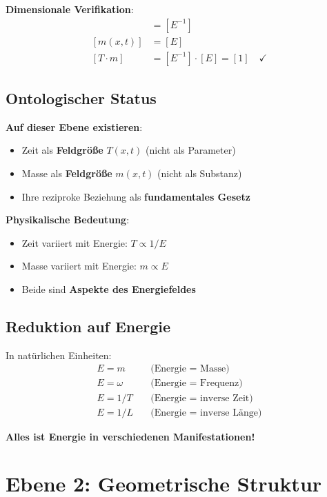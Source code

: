 \textbf{Dimensionale Verifikation}:
\begin{align}
[T(x,t)] &= [E^{-1}] \\
[m(x,t)] &= [E] \\
[T \cdot m] &= [E^{-1}] \cdot [E] = [1] \quad \checkmark
\end{align}

\subsection{Ontologischer Status}

\textbf{Auf dieser Ebene existieren}:
\begin{itemize}
\item Zeit als \textbf{Feldgröße} $T(x,t)$ (nicht als Parameter)
\item Masse als \textbf{Feldgröße} $m(x,t)$ (nicht als Substanz)
\item Ihre reziproke Beziehung als \textbf{fundamentales Gesetz}
\end{itemize}

\textbf{Physikalische Bedeutung}:
\begin{itemize}
\item Zeit variiert mit Energie: $T \propto 1/E$
\item Masse variiert mit Energie: $m \propto E$
\item Beide sind \textbf{Aspekte des Energiefeldes}
\end{itemize}

\subsection{Reduktion auf Energie}

In natürlichen Einheiten:
\begin{align}
E = m \quad &\text{(Energie = Masse)} \\
E = \omega \quad &\text{(Energie = Frequenz)} \\
E = 1/T \quad &\text{(Energie = inverse Zeit)} \\
E = 1/L \quad &\text{(Energie = inverse Länge)}
\end{align}

\textbf{Alles ist Energie in verschiedenen Manifestationen!}

\section{Ebene 2: Geometrische Struktur}

